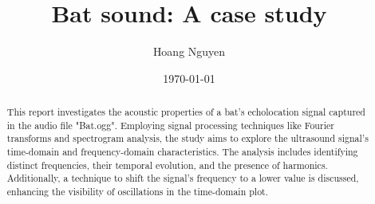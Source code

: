 \documentclass{article}
\title{Bat sound: A case study}
\author{Hoang Nguyen}
\date{\today}
\begin{document}
\maketitle

\begin{abstract}
    This report investigates the acoustic properties of a bat's echolocation signal captured in the audio file "Bat.ogg". Employing signal processing techniques like Fourier transforms and spectrogram analysis, the study aims to explore the ultrasound signal's time-domain and frequency-domain characteristics. The analysis includes identifying distinct frequencies, their temporal evolution, and the presence of harmonics. Additionally, a technique to shift the signal's frequency to a lower value is discussed, enhancing the visibility of oscillations in the time-domain plot.
\end{abstract}
\end{document}
